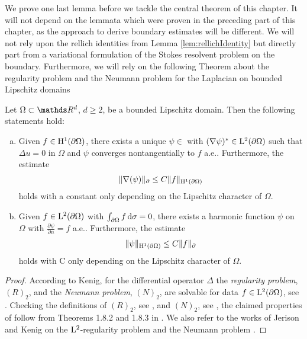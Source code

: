 We prove one last lemma before we tackle the central theorem of this chapter.
It will not depend on the lemmata which were proven in the preceding part of this chapter, as the approach to derive boundary estimates will be different.
We will not rely upon the rellich identities from Lemma \ref{lem:rellichIdentity} but directly part from a variational formulation of the Stokes resolvent problem on the boundary. Furthermore, we will rely on the following Theorem about the regularity problem and the Neumann problem for the Laplacian on bounded Lipschitz domains
\begin{thm}
  \label{thm:jerisonKenig}
  Let $\Omega \subset \R^d$, $d \geq 2$, be a bounded Lipschitz domain. Then the following statements hold:
  \begin{enumerate}[a)]
    \item Given $f \in \mathrm{H}^1(\partial\Omega)$, there exists a unique $\psi \in$ with $(\nabla \psi)^* \in \mathrm{L}^2(\partial\Omega)$ such that $\Delta u = 0$ in $\Omega$ and $\psi$ converges nontangentially to $f$ a.e.. Furthermore, the estimate 
      \begin{align*}
        \|\nabla(\psi)\|_\partial \leq C \|f\|_{\mathrm{H}^1(\partial\Omega)}
      \end{align*}
      holds with a constant only depending on the Lipschitz character of $\Omega$.
    \item Given $f \in \mathrm{L}^2(\partial\Omega)$ with $\int_{\partial\Omega} f \, {\operatorname{d}\!{\sigma}} = 0$, there exists a harmonic function $\psi$ on $\Omega$ with $\frac{\partial\psi}{\partial n} = f$ a.e.. Furthermore, the estimate
      \begin{align*}
        \| \psi\|_{\mathrm{H}^1(\partial\Omega)} \leq C \|f\|_\partial
      \end{align*}
      holds with C only depending on the Lipschitz character of $\Omega$.
  \end{enumerate}
\end{thm}

\begin{proof}
  According to Kenig, for the differential operator $\Delta$ the \emph{regularity problem}, $(R)_2$, and the \emph{Neumann problem}, $(N)_2$,  are solvable for data $f \in \mathrm{L}^2(\partial\Omega)$, see \cite[Thm. 2.1.10]{kenigBook}.
  Checking the definitions of $(R)_2$, see \cite[Defn. 1.7.10]{kenigBook}, and $(N)_2$, see \cite[Defn. 1.7.10]{kenigBook}, the claimed properties of follow from Theorems 1.8.2 and 1.8.3 in \cite[Chap. 1]{kenigBook}.
  We also refer to the works of Jerison and Kenig on the $\mathrm{L}^2$-regularity problem \cite{jerisonKenig2} and the Neumann problem \cite{jerisonKenig}.
\end{proof}

